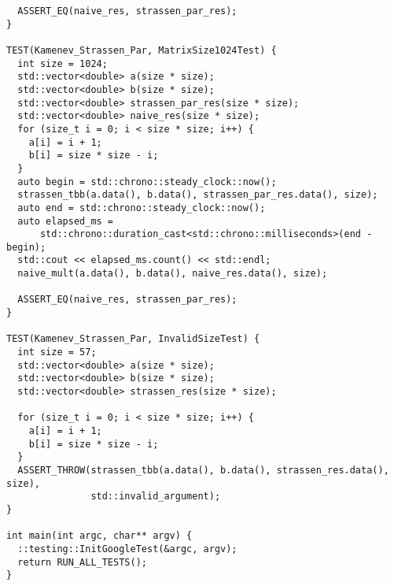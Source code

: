 \documentclass{report}
\begin{document}
\begin{lstlisting}
  ASSERT_EQ(naive_res, strassen_par_res);
}

TEST(Kamenev_Strassen_Par, MatrixSize1024Test) {
  int size = 1024;
  std::vector<double> a(size * size);
  std::vector<double> b(size * size);
  std::vector<double> strassen_par_res(size * size);
  std::vector<double> naive_res(size * size);
  for (size_t i = 0; i < size * size; i++) {
    a[i] = i + 1;
    b[i] = size * size - i;
  }
  auto begin = std::chrono::steady_clock::now();
  strassen_tbb(a.data(), b.data(), strassen_par_res.data(), size);
  auto end = std::chrono::steady_clock::now();
  auto elapsed_ms =
      std::chrono::duration_cast<std::chrono::milliseconds>(end - begin);
  std::cout << elapsed_ms.count() << std::endl;
  naive_mult(a.data(), b.data(), naive_res.data(), size);

  ASSERT_EQ(naive_res, strassen_par_res);
}

TEST(Kamenev_Strassen_Par, InvalidSizeTest) {
  int size = 57;
  std::vector<double> a(size * size);
  std::vector<double> b(size * size);
  std::vector<double> strassen_res(size * size);

  for (size_t i = 0; i < size * size; i++) {
    a[i] = i + 1;
    b[i] = size * size - i;
  }
  ASSERT_THROW(strassen_tbb(a.data(), b.data(), strassen_res.data(), size),
               std::invalid_argument);
}

int main(int argc, char** argv) {
  ::testing::InitGoogleTest(&argc, argv);
  return RUN_ALL_TESTS();
}


\end{lstlisting}
\end{document}
